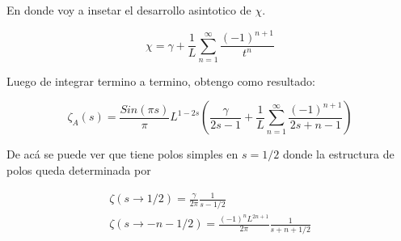 En donde voy a insetar el desarrollo asintotico de   $\chi$. 

\begin{equation}
    \chi = \gamma + \frac{1}{L} \sum _{n=1} ^{\infty} \frac{(-1) ^{n+1}}{t ^n}
\label{eq:chi}
\end{equation}

Luego de integrar termino a termino, obtengo como resultado:

\begin{equation}
    \zeta _A (s) = 
    \frac{Sin(\pi s)}{\pi} L ^{1-2s}
    \left(
    \frac{\gamma}{2s-1} + 
    \frac{1}{L}
    \sum _{n=1} ^{\infty}
    \frac{(-1) ^{n+1}}{2s+n-1}
    \right)
\label{eq.zeta.com}
\end{equation}

De acá se puede ver que tiene polos simples en $s=1/2$ donde la estructura de polos queda determinada por

\begin{equation}
\begin{array}{c}

\zeta(s \rightarrow 1/2) = \frac{\gamma}{2 \pi} \frac{1}{s-1/2} \\
\zeta (s \rightarrow -n - 1/2)  = \frac{ (-1) ^n L ^{2n+1}  }{2 \pi} \frac{1}{s + n + 1/2}

\end{array}
\end{equation}